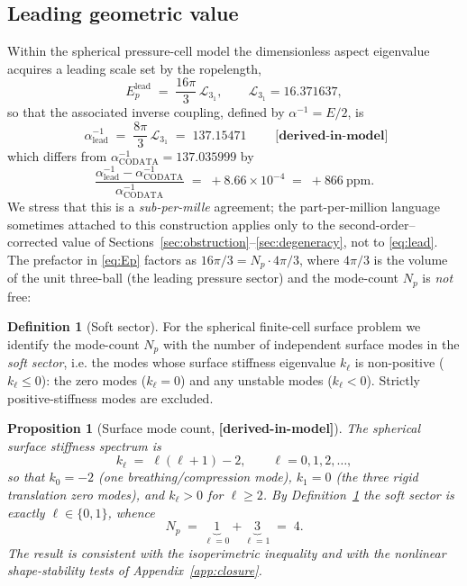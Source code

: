 \documentclass[11pt,a4paper]{article}
\newtheorem{proposition}{Proposition}
\theoremstyle{definition}
\newtheorem{definition}{Definition}
\newcommand{\derivedmodel}{\textbf{[derived-in-model]}}
\begin{document}
\subsection*{Leading geometric value}
Within the spherical pressure-cell model the dimensionless aspect eigenvalue
acquires a leading scale set by the ropelength,
\begin{equation}
  E_p^{\mathrm{lead}} \;=\; \frac{16\pi}{3}\,\mathcal{L}_{3_1},
  \qquad
  \mathcal{L}_{3_1}=16.371637,
  \label{eq:Ep}
\end{equation}
so that the associated inverse coupling, defined by $\alpha^{-1}=E/2$, is
\begin{equation}
  \boxed{\;\alpha^{-1}_{\mathrm{lead}}
  \;=\;\frac{8\pi}{3}\,\mathcal{L}_{3_1}
  \;=\;137.15471\;}
  \qquad \derivedmodel
  \label{eq:lead}
\end{equation}
which differs from $\alpha^{-1}_{\mathrm{CODATA}}=137.035999$ by
\begin{equation}
  \frac{\alpha^{-1}_{\mathrm{lead}}-\alpha^{-1}_{\mathrm{CODATA}}}
       {\alpha^{-1}_{\mathrm{CODATA}}}
  \;=\;+8.66\times10^{-4}\;=\;+866~\text{ppm}.
  \label{eq:leaddev}
\end{equation}
We stress that this is a \emph{sub-per-mille} agreement; the part-per-million
language sometimes attached to this construction applies only to the
second-order--corrected value of Sections~\ref{sec:obstruction}--\ref{sec:degeneracy},
not to \eqref{eq:lead}.
The prefactor in \eqref{eq:Ep} factors as $16\pi/3=N_p\cdot 4\pi/3$, where
$4\pi/3$ is the volume of the unit three-ball (the leading pressure sector) and
the mode-count $N_p$ is \emph{not} free:

\begin{definition}[Soft sector]
\label{def:soft}
For the spherical finite-cell surface problem we identify the mode-count $N_p$
with the number of independent surface modes in the \emph{soft sector}, i.e. the
modes whose surface stiffness eigenvalue $k_\ell$ is non-positive ($k_\ell\le0$):
the zero modes ($k_\ell=0$) and any unstable modes ($k_\ell<0$). Strictly
positive-stiffness modes are excluded.
\end{definition}

\begin{proposition}[Surface mode count, \derivedmodel{}]
\label{prop:Np}
The spherical surface stiffness spectrum is
\begin{equation}
  k_\ell \;=\; \ell(\ell+1)-2, \qquad \ell=0,1,2,\dots,
  \label{eq:kspectrum}
\end{equation}
so that $k_0=-2$ (one breathing/compression mode), $k_1=0$ (the three rigid
translation zero modes), and $k_\ell>0$ for $\ell\ge2$. By
Definition~\ref{def:soft} the soft sector is exactly $\ell\in\{0,1\}$, whence
\begin{equation}
  N_p \;=\; \underbrace{1}_{\ell=0}+\underbrace{3}_{\ell=1} \;=\; 4.
\end{equation}
The result is consistent with the isoperimetric inequality and with the nonlinear
shape-stability tests of Appendix~\ref{app:closure}.
\end{proposition}
\end{document}
